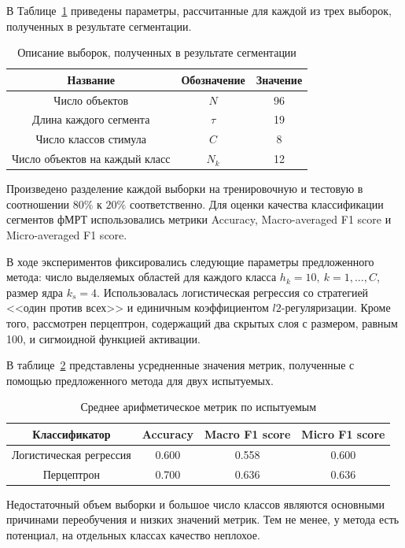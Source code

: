 В Таблице~\ref{table:sample_3} приведены параметры, рассчитанные для каждой из трех выборок, полученных в результате сегментации.
\begin{table}[h!]
	\centering
	\caption{Описание выборок, полученных в результате сегментации}
	\begin{tabular}{|c|c|c|}
		\hline
		Название                       & Обозначение & Значение             \\
		\hline \hline
		Число объектов & $N$ & 96 \\ \hline
		  Длина каждого сегмента           & $\tau$       & 19 \\ \hline
	   Число классов стимула             & $C$   & 8          \\ \hline
        Число объектов на каждый класс             & $N_k$   & 12         \\ \hline   
	\end{tabular}
	\label{table:sample_3}
\end{table} 

Произведено разделение каждой выборки на тренировочную и тестовую в соотношении $80\%$ к $20\%$ соответственно. Для оценки качества классификации сегментов фМРТ использовались метрики Accuracy, Macro-averaged F1 score и Micro-averaged F1 score.

В ходе экспериментов фиксировались следующие параметры предложенного метода: число выделяемых областей для каждого класса $h_k = 10,~k=1,\ldots, C$, размер ядра $k_s = 4$. Использовалась логистическая регрессия со стратегией <<один против всех>> и единичным коэффициентом $l2$-регуляризации. Кроме того, рассмотрен перцептрон, содержащий два скрытых слоя с размером, равным 100, и сигмоидной функцией активации.

В таблице~\ref{results} представлены усредненные значения метрик, полученные с помощью предложенного метода для двух испытуемых. 
\begin{table}[h!]
	\centering
	\caption{Среднее арифметическое метрик по испытуемым}
	\begin{tabular}{|c|c|c|c|}
		\hline
		Классификатор & Accuracy &  Macro F1 score & Micro F1 score\\
		\hline \hline
		Логистическая регрессия & 0.600 & 0.558 & 0.600\\ \hline  
          Перцептрон  & 0.700 & 0.636 & 0.636\\ \hline 
	\end{tabular}
	\label{results}
\end{table} 
Недостаточный объем выборки и большое число классов являются основными причинами переобучения и низких значений метрик. Тем не менее, у метода есть потенциал, на отдельных классах качество неплохое.

